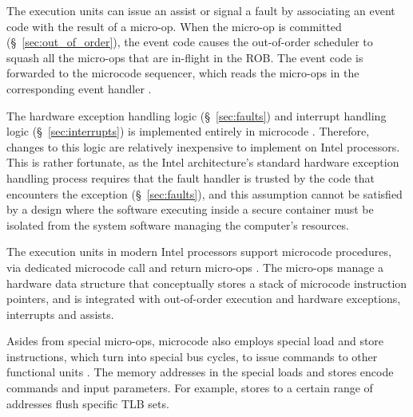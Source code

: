 The execution units can issue an assist or signal a fault by associating an
event code with the result of a micro-op. When the micro-op is committed
(\S~\ref{sec:out_of_order}), the event code causes the out-of-order scheduler
to squash all the micro-ops that are in-flight in the ROB. The event code is
forwarded to the microcode sequencer, which reads the micro-ops in the
corresponding event handler \cite{intel1997events, intel1999exceptions}.

The hardware exception handling logic (\S~\ref{sec:faults}) and interrupt
handling logic (\S~\ref{sec:interrupts}) is implemented entirely in microcode
\cite{intel1999exceptions}. Therefore, changes to this logic are relatively
inexpensive to implement on Intel processors. This is rather fortunate, as the
Intel architecture's standard hardware exception handling process requires that
the fault handler is trusted by the code that encounters the exception
(\S~\ref{sec:faults}), and this assumption cannot be satisfied by a design
where the software executing inside a secure container must be isolated from
the system software managing the computer's resources.


The execution units in modern Intel processors support microcode procedures,
via dedicated microcode call and return micro-ops \cite{intel2007microstack}.
The micro-ops manage a hardware data structure that conceptually stores a stack
of microcode instruction pointers, and is integrated with out-of-order
execution and hardware exceptions, interrupts and assists.


Asides from special micro-ops, microcode also employs special load and store
instructions, which turn into special bus cycles, to issue commands to other
functional units \cite{intel1997microspace}. The memory addresses in the
special loads and stores encode commands and input parameters. For example,
stores to a certain range of addresses flush specific TLB sets.


\label{sec:microcode_pmh}


